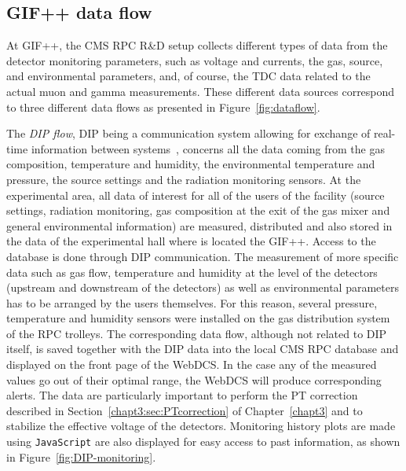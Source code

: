	\subsection{GIF++ data flow}
	\label{chapt5:ssec:dataflow}
	
	At GIF++, the CMS RPC R\&D setup collects different types of data from the detector monitoring parameters, such as voltage and currents, the gas, source, and environmental parameters, and, of course, the TDC data related to the actual muon and gamma measurements. These different data sources correspond to three different data flows as presented in Figure~\ref{fig:dataflow}.
	
	The \textit{\acf{DIP} flow}, DIP being a communication system allowing for exchange of real-time information between systems~\cite{DIP}, concerns all the data coming from the gas composition, temperature and humidity, the environmental temperature and pressure, the source settings and the radiation monitoring sensors. At the experimental area, all data of interest for all of the users of the facility (source settings, radiation monitoring, gas composition at the exit of the gas mixer and general environmental information) are measured, distributed and also stored in the data of the experimental hall where is located the GIF++. Access to the database is done through DIP communication. The measurement of more specific data such as gas flow, temperature and humidity at the level of the detectors (upstream and downstream of the detectors) as well as environmental parameters has to be arranged by the users themselves. For this reason, several pressure, temperature and humidity sensors were installed on the gas distribution system of the RPC trolleys. The corresponding data flow, although not related to DIP itself, is saved together with the DIP data into the local CMS RPC database and displayed on the front page of the WebDCS. In the case any of the measured values go out of their optimal range, the WebDCS will produce corresponding alerts. The data are particularly important to perform the PT correction described in Section~\ref{chapt3:sec:PTcorrection} of Chapter~\ref{chapt3} and to stabilize the effective voltage of the detectors. Monitoring history plots are made using \texttt{JavaScript} are also displayed for easy access to past information, as shown in Figure~\ref{fig:DIP-monitoring}.

